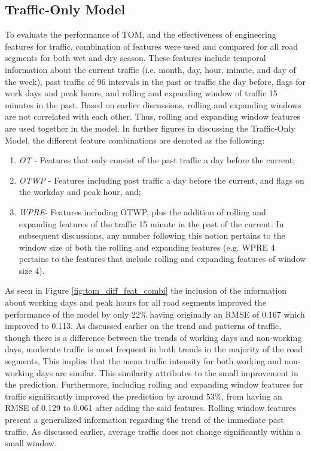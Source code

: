 \subsection{Traffic-Only Model}
To evaluate the performance of TOM, and the effectiveness of engineering features for traffic, combination of features were used and compared for all road segments for both wet and dry season. These features include temporal information about the current traffic (i.e. month, day, hour, minute, and day of the week), past traffic of 96 intervals in the past or traffic the day before, flags for work days and peak hours, and rolling and expanding window of traffic 15 minutes in the past. Based on earlier discussions, rolling and expanding windows are not correlated with each other. Thus, rolling and expanding window features are used together in the model. In further figures in discussing the Traffic-Only Model, the different feature combinations are denoted as the following:

\begin{enumerate}
\item \textit{OT} - Features that only consist of the past traffic a day before the current;
\item \textit{OTWP} - Features including past traffic a day before the current, and flags on the workday and peak hour, and;
\item \textit{WPRE}- Features including OTWP, plus the addition of rolling and expanding features of the traffic 15 minute in the past of the current. In subsequent discussions, any number following this notion pertains to the window size of both the rolling and expanding features (e.g. WPRE 4 pertains to the features that include rolling and expanding features of window size 4).
\end{enumerate}

As seen in Figure \ref{fig:tom_diff_feat_combi} the inclusion of the information about working days and peak hours for all road segments improved the performance of the model by only 22\% having originally an RMSE of 0.167 which improved to 0.113. As discussed earlier on the trend and patterns of traffic, though there is a difference between the trends of working days and non-working days, moderate traffic is most frequent in both trends in the majority of the road segments, This implies that the mean traffic intensity for both working and non-working days are similar. This similarity attributes to the small improvement in the prediction. Furthermore, including rolling and expanding window features for traffic significantly improved the prediction by around 53\%, from having an RMSE of 0.129 to 0.061 after adding the said features. Rolling window features present a generalized information regarding the trend of the immediate past traffic. As discussed earlier, average traffic does not change significantly within a small window.   

